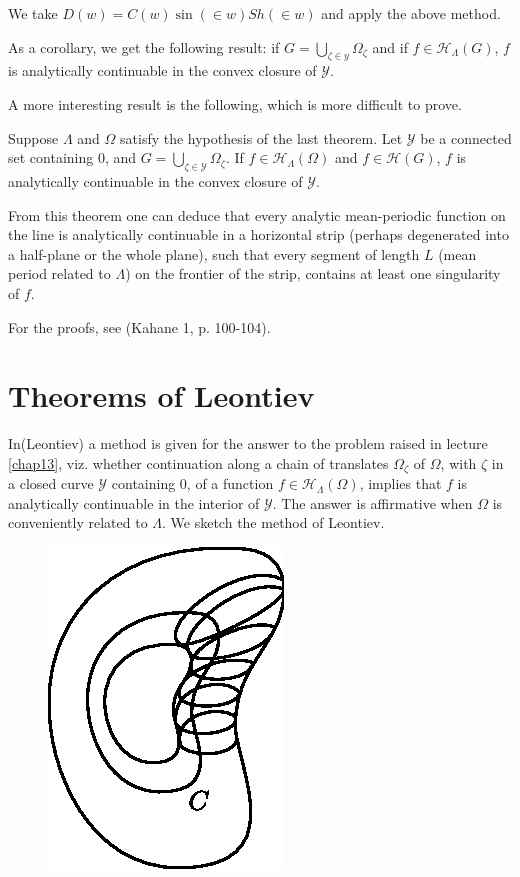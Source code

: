 We take $D(w) = C(w) \sin (\in w) Sh (\in w)$ and
apply the above method. 

As a corollary, we get the following result: if $G =
\bigcup\limits_{\zeta \in y} \Omega_\zeta$ and if $f \in 
\mathscr{H}_\Lambda (G)$, $f$ is analytically continuable in the
convex closure of $\mathscr{Y}$. 

A more interesting result is the following, which is more difficult to prove.

\begin{theorem*} %
 Suppose $\Lambda$ and $\Omega$ satisfy the hypothesis of the last
 theorem. Let $\mathscr{Y}$ be a connected set containing $0$, and $G
 = \bigcup_{\zeta \in \mathscr{Y}} \Omega_\zeta$. If $f \in
 \mathscr{H}_\Lambda (\Omega)$ and $f \in \mathscr{H}(G)$, $f$ is
 analytically continuable in the convex closure of $\mathscr{Y}$. 
\end{theorem*}

From this theorem one can deduce that every analytic mean-periodic
function on the line is analytically continuable in a horizontal strip
(perhaps degenerated into a half-plane or the whole plane), such that
every segment of length $L$ (mean period related to $\Lambda$) on the
frontier of the strip, contains at least one singularity of $f$. 

For the proofs, see (Kahane 1, p. 100-104).

\section{Theorems of Leontiev}\label{chap16:sec3}%

In\pageoriginale (Leontiev) a method is given for the answer to the problem raised
in lecture \ref{chap13}, viz. whether continuation along a chain of translates
$\Omega_\zeta $ of $\Omega$, with $\zeta$ in a closed curve
$\mathscr{Y}$ containing 0, of a function $f \in \mathscr{H}_\Lambda
(\Omega)$, implies that $f$ is analytically continuable in the
interior of $\mathscr{Y}$. The answer is affirmative when $\Omega$ is
conveniently related to $\Lambda$. We sketch the method of Leontiev. 
\begin{figure}[H]
 \centerline{\includegraphics{vol15-figures/fig15-20.eps}}
\end{figure}

